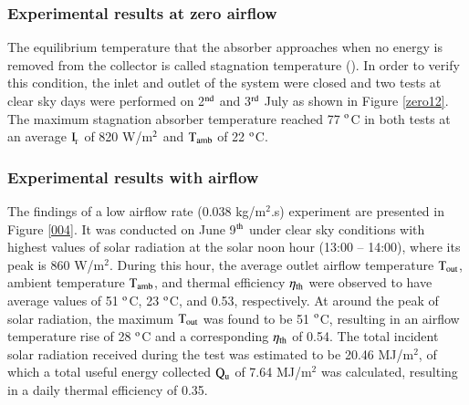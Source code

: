 \subsubsection{Experimental results at zero airflow}

The equilibrium temperature that the absorber approaches when no energy is removed from the collector is called stagnation temperature (\cite{Rabl1985}). In order to verify this condition, the inlet and outlet of the system were closed and two tests at clear sky days were performed on 2$^{\rm{nd}}$ and 3$^{\rm{rd}}$ July as shown in Figure \ref{zero12}. The maximum stagnation absorber temperature reached 77 $^{\rm{o}}$C in both tests at an average $\rm{I_{\!_T}}$ of 820 W/m$^{\rm{2}}$ and $\rm{T_{amb}}$ of 22 $^{\rm{o}}$C.


\subsubsection{Experimental results with airflow}

The findings of a low airflow rate (0.038 kg/m$^2$.s) experiment are presented in Figure \ref{004}. It was conducted on June 9$^{\rm{th}}$ under clear sky conditions with highest values of solar radiation at the solar noon hour (13:00 -- 14:00), where its peak is 860 W/m$^2$. During this hour, the average outlet airflow temperature $\rm{T_{out}}$, ambient temperature $\rm{T_{amb}}$, and thermal efficiency $\eta_{\rm{th}}$ were observed to have average values of 51 $^{\rm{o}}$C, 23 $^{\rm{o}}$C, and 0.53, respectively. At around the peak of solar radiation, the maximum $\rm{T_{out}}$ was found to be 51 $^{\rm{o}}$C, resulting in an airflow temperature rise of 28 $^{\rm{o}}$C and a corresponding $\eta_{\rm{th}}$ of 0.54. The total incident solar radiation received during the test was estimated to be 20.46 MJ/m$^2$, of which a total useful energy collected $\rm{Q_{u}}$ of 7.64 MJ/m$^2$ was calculated, resulting in a daily thermal efficiency of 0.35.

